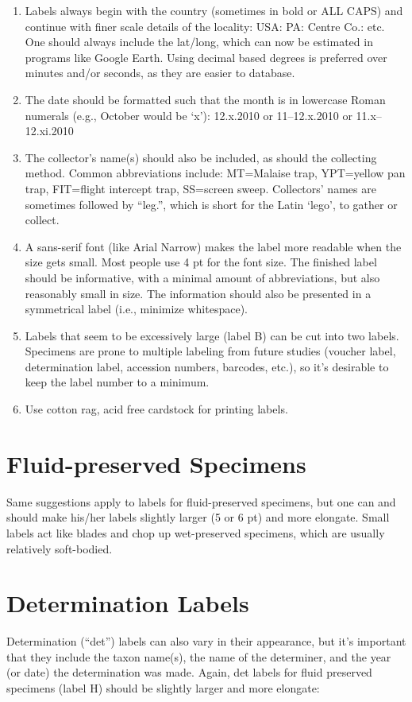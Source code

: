 \documentclass[letterpaper, 11pt]{article}
\begin{document}
\begin{enumerate}
\item Labels always begin with the country (sometimes in bold or ALL CAPS) and continue with finer scale details of the locality: USA: PA: Centre Co.: etc. One should always include the lat/long, which can now be estimated in programs like Google Earth. Using decimal based degrees is preferred over minutes and/or seconds, as they are easier to database.
\item The date should be formatted such that the month is in lowercase Roman numerals (e.g., October would be ‘x’): 12.x.2010 or 11–12.x.2010 or 11.x–12.xi.2010
\item The collector’s name(s) should also be included, as should the collecting method. Common abbreviations include: MT=Malaise trap, YPT=yellow pan trap, FIT=flight intercept trap, SS=screen sweep. Collectors’ names are sometimes followed by “leg.”, which is short for the Latin ‘lego’, to gather or collect.
\item A sans-serif font (like Arial Narrow) makes the label more readable when the size gets small. Most people use 4 pt for the font size. The finished label should be informative, with a minimal amount of abbreviations, but also reasonably small in size. The information should also be presented in a symmetrical label (i.e., minimize whitespace).
\item Labels that seem to be excessively large (label B) can be cut into two labels. Specimens are prone to multiple labeling from future studies (voucher label, determination label, accession numbers, barcodes, etc.), so it’s desirable to keep the label number to a minimum.
\item Use cotton rag, acid free cardstock for printing labels.
\end{enumerate}

\section{Fluid-preserved Specimens}
Same suggestions apply to labels for fluid-preserved specimens, but one can and should make his/her labels slightly larger (5 or 6 pt) and more elongate. Small labels act like blades and chop up wet-preserved specimens, which are usually relatively soft-bodied.

\section{Determination Labels}
Determination (``det'') labels can also vary in their appearance, but it’s important that they include the taxon name(s), the name of the determiner, and the year (or date) the determination was made. Again, det labels for fluid preserved specimens (label H) should be slightly larger and more elongate:
\end{document}
